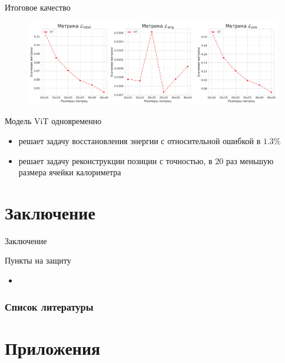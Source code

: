 \documentclass[9pt]{beamer}
\begin{document}
\begin{frame}{Итоговое качество}
    \begin{figure}
        \centering
        \includegraphics[width=1.0\textwidth]{../report/graphics/best_vit.png}
    \end{figure}

    \begin{block}{Модель ViT одновременно}
        \begin{itemize}
            \item решает задачу восстановления энергии с относительной ошибкой в $1.3\%$
            \item решает задачу реконструкции позиции с точностью, в $20$ раз меньшую размера ячейки калориметра
        \end{itemize}
    \end{block}
\end{frame}

\section{Заключение}

\begin{frame}{Заключение}
    \begin{block}{Пункты на защиту}
        \begin{itemize}
            \item 
        \end{itemize}
    \end{block}
\end{frame}

\begin{frame}[allowframebreaks]
    \frametitle{Список литературы}
    \printbibliography
\end{frame}

\section{Приложения}
\end{document}
